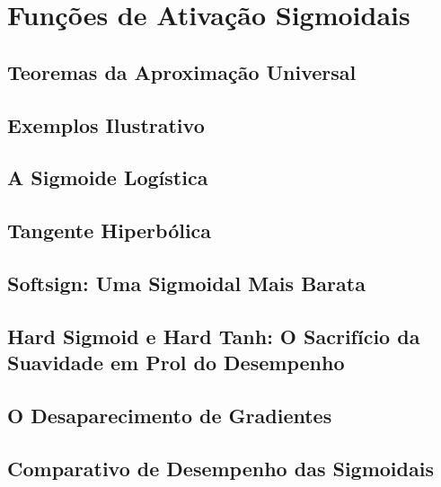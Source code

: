
\chapter{Funções de Ativação Sigmoidais}
\label{cap:ativacao-sigmoidais}



\section{Teoremas da Aproximação Universal}

\section{Exemplos Ilustrativo}

\section{A Sigmoide Logística}

\section{Tangente Hiperbólica}

\section{Softsign: Uma Sigmoidal Mais Barata}

\section{Hard Sigmoid e Hard Tanh: O Sacrifício da Suavidade em Prol do Desempenho}

\section{O Desaparecimento de Gradientes}

\section{Comparativo de Desempenho das Sigmoidais}